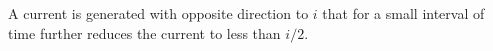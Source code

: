 A current is generated with opposite direction to $i$ %
that for  %
a small interval of time further reduces the
current to less than $i/2$.